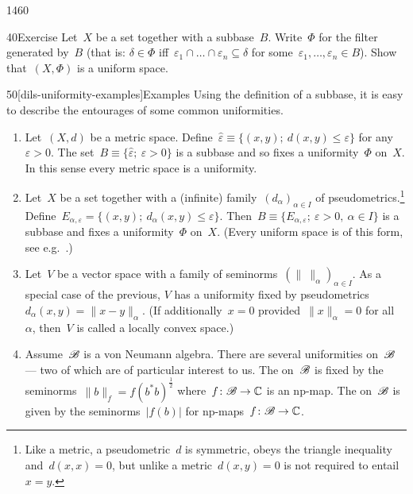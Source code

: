 \begin{parsec}{1460}
\begin{point}{40}{Exercise}%
Let~$X$ be a set together with a subbase~$B$.
Write~$\Phi$ for the filter generated by~$B$
    (that is: $\delta \in \Phi$
        iff~$\varepsilon_1 \cap \ldots \cap \varepsilon_n \subseteq \delta$
            for some~$\varepsilon_1, \ldots, \varepsilon_n \in B$).
Show that~$(X,\Phi)$ is a uniform space.
\end{point}
\begin{point}{50}[dils-uniformity-examples]{Examples}%
Using the definition of a subbase, it is easy
to describe the entourages of some common uniformities.
    \begin{enumerate}
        \item
    Let~$(X,d)$ be a metric space.
Define~$\hat\varepsilon \equiv \{(x,y);\ d(x,y) \leq \varepsilon\}$
for any $\varepsilon > 0$.
The set~$B \equiv \{ \hat\varepsilon; \ \varepsilon > 0\}$
is a subbase and so fixes a uniformity~$\Phi$ on~$X$.
In this sense every metric space is a uniformity.
        \item
    Let~$X$ be a set together with a (infinite)
            family~$(d_{\alpha})_{\alpha\in I}$
            of pseudometrics.\footnote{Like a metric,
                a pseudometric~$d$ is symmetric,
                obeys the triangle inequality
                    and~$d(x,x)=0$,
                    but unlike a metric~$d(x,y)=0$
                    is not required to entail~$x=y$.}
    Define~$E_{\alpha,\varepsilon} = \{ (x,y); \ d_\alpha(x,y)
            \leq \varepsilon\}$.
            Then~$B \equiv \{ E_{\alpha,\varepsilon}; \ \varepsilon > 0, \ 
                    \alpha \in I\}$
                    is a subbase and fixes
                    a uniformity~$\Phi$ on~$X$.
(Every uniform space is of this form, see e.g.~\cite[Thm.~39.11]{willard}.)
\item
Let~$V$ be a vector space with a
family of seminorms~$(\|\  \|_\alpha)_{\alpha \in I}$.
As a special case of the previous,
 $V$ has a uniformity fixed by
    pseudometrics~$d_\alpha(x,y) = \|x-y\|_\alpha$.
    (If additionally~$x =0$ provided~$\|x\|_\alpha = 0$ for all~$\alpha$,
    then~$V$ is called a locally convex space.)

\item
Assume~$\mathscr{B}$ is a von Neumann algebra.
There are several uniformities on~$\mathscr{B}$ --- two of which
    are of particular interest to us.
    The  on~$\mathscr{B}$
is fixed by the seminorms~$\|b\|_f = f(b^*b)^{\frac{1}{2}}$
        where~$f\colon \mathscr{B} \to \mathbb{C}$ is an np-map.
        The  on~$\mathscr{B}$
    is given by the seminorms~$|f(b)|$
        for np-maps~$f\colon \mathscr{B} \to \mathbb{C}$.


\end{enumerate}
\end{point}
\end{parsec}
